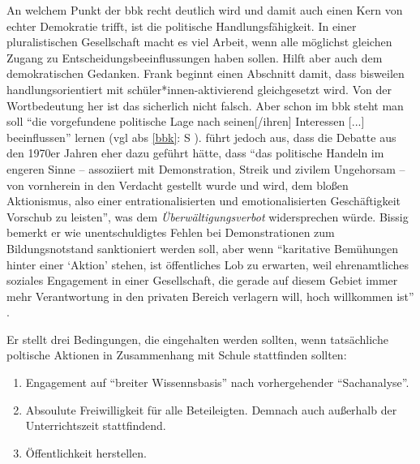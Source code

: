 An welchem Punkt der \gls{bbk} recht deutlich wird und damit auch einen Kern von echter Demokratie trifft, ist die politische Handlungsfähigkeit. In einer pluralistischen Gesellschaft macht es viel Arbeit, wenn alle möglichst gleichen Zugang zu Entscheidungsbeeinflussungen haben sollen. Hilft aber auch dem demokratischen Gedanken. 
Frank \textcite[466]{Nonnenmacher2010} beginnt einen Abschnitt damit, dass bisweilen handlungsorientiert mit schüler*innen-aktivierend gleichgesetzt wird. Von der Wortbedeutung her ist das sicherlich nicht falsch. Aber schon im \gls{bbk} steht man soll \enquote{die vorgefundene politische Lage nach seinen[/ihren] Interessen [...] beeinflussen} lernen (\gls{vgl} \gls{abs} \ref{bbk}: \gls{S} \pageref{bbk}). \textcite[466-467]{Nonnenmacher2010} führt jedoch aus, dass die Debatte aus den 1970er Jahren eher dazu geführt hätte, dass \enquote{das politische Handeln im engeren Sinne -- assoziiert mit Demonstration, Streik und zivilem Ungehorsam -- von vornherein in den Verdacht gestellt wurde und wird, dem bloßen Aktionismus, also einer entrationalisierten und emotionalisierten Geschäftigkeit Vorschub zu leisten}, was dem \emph{Überwältigungsverbot} widersprechen würde.
Bissig bemerkt er wie unentschuldigtes Fehlen bei Demonstrationen zum Bildungsnotstand sanktioniert werden soll, aber wenn \enquote{karitative Bemühungen hinter einer \enquote{Aktion} stehen, ist öffentliches Lob zu erwarten, weil ehrenamtliches soziales Engagement in einer Gesellschaft, die gerade auf diesem Gebiet immer mehr Verantwortung in den privaten Bereich verlagern will, hoch willkommen ist} \autocite[467]{Nonnenmacher2010}.


Er stellt drei Bedingungen, die eingehalten werden sollten, wenn tatsächliche poltische Aktionen in Zusammenhang mit Schule stattfinden sollten:
\begin{enumerate}
    \item Engagement auf \enquote{breiter Wissennsbasis} nach vorhergehender \enquote{Sachanalyse}.
    \item Absoulute Freiwilligkeit für alle Beteileigten. Demnach auch außerhalb der Unterrichtszeit stattfindend.
    \item Öffentlichkeit herstellen. %
    
    \autocite[467]{Nonnenmacher2010}
\end{enumerate}


